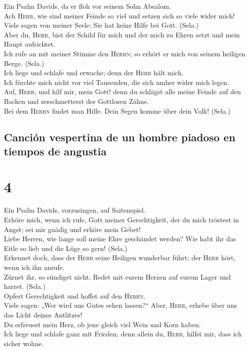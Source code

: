  Ein Psalm Davids, da er floh vor seinem Sohn Absalom.\\
 Ach \textsc{Herr}, wie sind meiner Feinde so viel und
setzen sich so viele wider mich!\\
 Viele sagen von meiner Seele: Sie hat keine Hilfe bei
Gott. (Sela.)\\
 Aber du, \textsc{Herr}, bist der Schild für mich und der
mich zu Ehren setzt und mein Haupt aufrichtet.\\
 Ich rufe an mit meiner Stimme den \textsc{Herrn}; so
erhört er mich von seinem heiligen Berge. (Sela.)\\
 Ich liege und schlafe und erwache; denn der \textsc{Herr}
hält mich.\\
 Ich fürchte mich nicht vor viel Tausenden, die sich umher
wider mich legen.\\
 Auf, \textsc{Herr}, und hilf mir, mein Gott! denn du
schlägst alle meine Feinde auf den Backen und zerschmetterst der
Gottlosen Zähne.\\
 Bei dem \textsc{Herrn} findet man Hilfe. Dein Segen komme
über dein Volk! (Sela.)

\hypertarget{canciuxf3n-vespertina-de-un-hombre-piadoso-en-tiempos-de-angustia}{%
\subsection{Canción vespertina de un hombre piadoso en tiempos de
angustia}\label{canciuxf3n-vespertina-de-un-hombre-piadoso-en-tiempos-de-angustia}}

\hypertarget{section-3}{%
\section{4}\label{section-3}}

 Ein Psalm Davids, vorzusingen, auf Saitenspiel.\\
 Erhöre mich, wenn ich rufe, Gott meiner Gerechtigkeit,
der du mich tröstest in Angst; sei mir gnädig und erhöre mein Gebet!\\
 Liebe Herren, wie lange soll meine Ehre geschändet
werden? Wie habt ihr das Eitle so lieb und die Lüge so gern! (Sela.)\\
 Erkennet doch, dass der \textsc{Herr} seine Heiligen
wunderbar führt; der \textsc{Herr} hört, wenn ich ihn anrufe.\\
 Zürnet ihr, so sündiget nicht. Redet mit eurem Herzen auf
eurem Lager und harret. (Sela.)\\
 Opfert Gerechtigkeit und hoffet auf den \textsc{Herrn}.\\
 Viele sagen: „Wer wird uns Gutes sehen lassen?{}`` Aber,
\textsc{Herr}, erhebe über uns das Licht deines Antlitzes!\\
 Du erfreuest mein Herz, ob jene gleich viel Wein und Korn
haben.\\
 Ich liege und schlafe ganz mit Frieden; denn allein du,
\textsc{Herr}, hilfst mir, dass ich sicher wohne.


